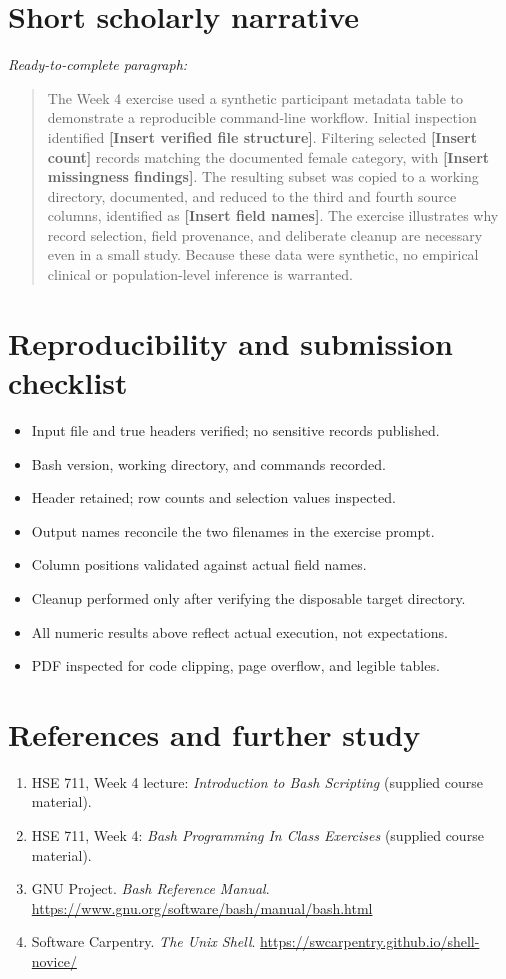 \documentclass[11pt,letterpaper]{article}
\newcommand{\fillin}[1]{\textbf{[Insert #1]}}
\begin{document}
\section{Short scholarly narrative}
\noindent\textit{Ready-to-complete paragraph:}

\begin{quote}
The Week 4 exercise used a synthetic participant metadata table to demonstrate
a reproducible command-line workflow. Initial inspection identified
\fillin{verified file structure}. Filtering selected \fillin{count} records
matching the documented female category, with \fillin{missingness findings}.
The resulting subset was copied to a working directory, documented, and reduced
to the third and fourth source columns, identified as \fillin{field names}.
The exercise illustrates why record selection, field provenance, and deliberate
cleanup are necessary even in a small study. Because these data were synthetic,
no empirical clinical or population-level inference is warranted.
\end{quote}

\section{Reproducibility and submission checklist}
\begin{itemize}[label=$\square$]
\item Input file and true headers verified; no sensitive records published.
\item Bash version, working directory, and commands recorded.
\item Header retained; row counts and selection values inspected.
\item Output names reconcile the two filenames in the exercise prompt.
\item Column positions validated against actual field names.
\item Cleanup performed only after verifying the disposable target directory.
\item All numeric results above reflect actual execution, not expectations.
\item PDF inspected for code clipping, page overflow, and legible tables.
\end{itemize}

\section{References and further study}
\begin{enumerate}
\item HSE 711, Week 4 lecture: \emph{Introduction to Bash Scripting}
(supplied course material).
\item HSE 711, Week 4: \emph{Bash Programming In Class Exercises}
(supplied course material).
\item GNU Project. \emph{Bash Reference Manual}.
\url{https://www.gnu.org/software/bash/manual/bash.html}
\item Software Carpentry. \emph{The Unix Shell}.
\url{https://swcarpentry.github.io/shell-novice/}
\end{enumerate}
\end{document}
